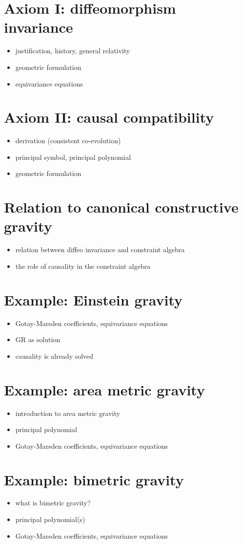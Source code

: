 \section{Axiom I: diffeomorphism invariance}
\begin{itemize}
\item justification, history, general relativity
\item geometric formulation
\item equivariance equations
\end{itemize}

\section{Axiom II: causal compatibility}
\begin{itemize}
\item derivation (consistent co-evolution)
\item principal symbol, principal polynomial
\item geometric formulation
\end{itemize}

\section{Relation to canonical constructive gravity}
\begin{itemize}
\item relation between diffeo invariance and constraint algebra
\item the role of causality in the constraint algebra
\end{itemize}

\section{Example: Einstein gravity}
\begin{itemize}
\item Gotay-Marsden coefficients, equivariance equations
\item GR as solution
\item causality is already solved
\end{itemize}

\section{Example: area metric gravity}
\begin{itemize}
\item introduction to area metric gravity
\item principal polynomial
\item Gotay-Marsden coefficients, equivariance equations
\end{itemize}

\section{Example: bimetric gravity}
\begin{itemize}
\item what is bimetric gravity?
\item principal polynomial(s)
\item Gotay-Marsden coefficients, equivariance equations
\end{itemize}

